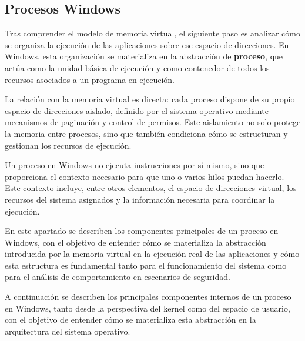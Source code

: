\subsection{Procesos Windows}

Tras comprender el modelo de memoria virtual, el siguiente paso es analizar cómo se organiza la ejecución de las aplicaciones sobre ese espacio de direcciones. En Windows, esta organización se materializa en la abstracción de \textbf{proceso}, que actúa como la unidad básica de ejecución y como contenedor de todos los recursos asociados a un programa en ejecución.

La relación con la memoria virtual es directa: cada proceso dispone de su propio espacio de direcciones aislado, definido por el sistema operativo mediante mecanismos de paginación y control de permisos. Este aislamiento no solo protege la memoria entre procesos, sino que también condiciona cómo se estructuran y gestionan los recursos de ejecución.

Un proceso en Windows no ejecuta instrucciones por sí mismo, sino que proporciona el contexto necesario para que uno o varios hilos puedan hacerlo. Este contexto incluye, entre otros elementos, el espacio de direcciones virtual, los recursos del sistema asignados y la información necesaria para coordinar la ejecución.

En este apartado se describen los componentes principales de un proceso en Windows, con el objetivo de entender cómo se materializa la abstracción introducida por la memoria virtual en la ejecución real de las aplicaciones y cómo esta estructura es fundamental tanto para el funcionamiento del sistema como para el análisis de comportamiento en escenarios de seguridad.

A continuación se describen los principales componentes internos de un proceso en Windows, tanto desde la perspectiva del kernel como del espacio de usuario, con el objetivo de entender cómo se materializa esta abstracción en la arquitectura del sistema operativo.

